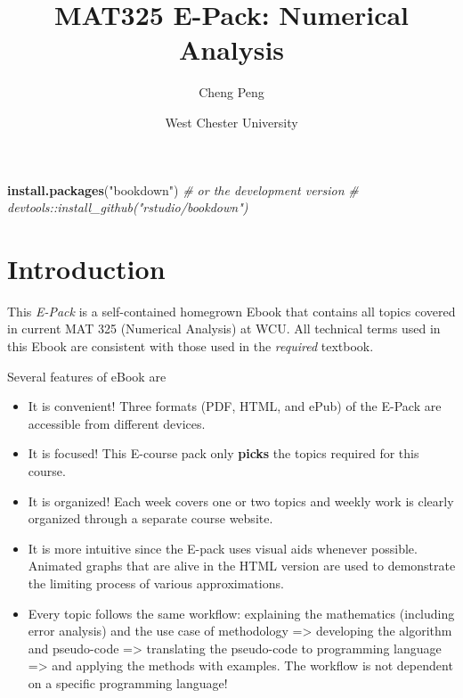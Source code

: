 \documentclass[
]{book}
\title{MAT325 E-Pack: Numerical Analysis}
\author{Cheng Peng}
\date{West Chester University}
\newenvironment{Shaded}{\begin{snugshade}}{\end{snugshade}}
\newcommand{\CommentTok}[1]{\textcolor[rgb]{0.56,0.35,0.01}{\textit{#1}}}
\newcommand{\FunctionTok}[1]{\textcolor[rgb]{0.13,0.29,0.53}{\textbf{#1}}}
\newcommand{\NormalTok}[1]{#1}
\newcommand{\StringTok}[1]{\textcolor[rgb]{0.31,0.60,0.02}{#1}}
\begin{document}
\maketitle

{
\setcounter{tocdepth}{1}
\tableofcontents
}
\begin{Shaded}
\begin{Highlighting}[]
\FunctionTok{install.packages}\NormalTok{(}\StringTok{"bookdown"}\NormalTok{)}
\CommentTok{\# or the development version}
\CommentTok{\# devtools::install\_github("rstudio/bookdown")}
\end{Highlighting}
\end{Shaded}

\hypertarget{introduction}{%
\chapter{Introduction}\label{introduction}}

This \emph{E-Pack} is a self-contained homegrown Ebook that contains all topics covered in current MAT 325 (Numerical Analysis) at WCU. All technical terms used in this Ebook are consistent with those used in the \emph{required} textbook.

Several features of eBook are

\begin{itemize}
\item
  It is convenient! Three formats (PDF, HTML, and ePub) of the E-Pack are accessible from different devices.
\item
  It is focused! This E-course pack only \textbf{picks} the topics required for this course.
\item
  It is organized! Each week covers one or two topics and weekly work is clearly organized through a separate course website.
\item
  It is more intuitive since the E-pack uses visual aids whenever possible. Animated graphs that are alive in the HTML version are used to demonstrate the limiting process of various approximations.
\item
  Every topic follows the same workflow: explaining the mathematics (including error analysis) and the use case of methodology =\textgreater{} developing the algorithm and pseudo-code =\textgreater{} translating the pseudo-code to programming language =\textgreater{} and applying the methods with examples. The workflow is not dependent on a specific programming language!
\end{itemize}
\end{document}
